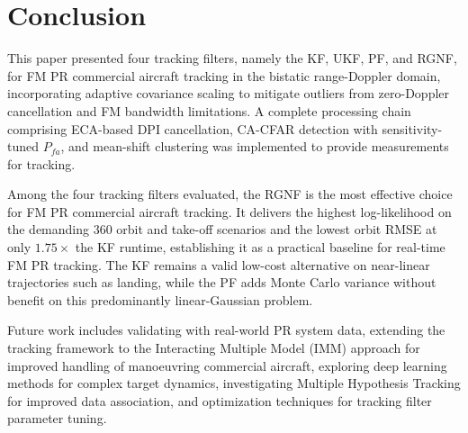 \documentclass[conference]{IEEEtran}
\begin{document}
\section{Conclusion}

This paper presented four tracking filters, namely the KF, UKF, PF, and RGNF, for FM PR commercial aircraft tracking in the bistatic range-Doppler domain, incorporating adaptive covariance scaling to mitigate outliers from zero-Doppler cancellation and FM bandwidth limitations. A complete processing chain comprising ECA-based DPI cancellation, CA-CFAR detection with sensitivity-tuned $P_{fa}$, and mean-shift clustering was implemented to provide measurements for tracking.

Among the four tracking filters evaluated, the RGNF is the most effective choice for FM PR commercial aircraft tracking. It delivers the highest log-likelihood on the demanding 360\textdegree{} orbit and take-off scenarios and the lowest orbit RMSE at only $1.75{\times}$ the KF runtime, establishing it as a practical baseline for real-time FM PR tracking. The KF remains a valid low-cost alternative on near-linear trajectories such as landing, while the PF adds Monte Carlo variance without benefit on this predominantly linear-Gaussian problem.

Future work includes validating with real-world PR system data, extending the tracking framework to the Interacting Multiple Model (IMM) approach for improved handling of manoeuvring commercial aircraft, exploring deep learning methods for complex target dynamics, investigating Multiple Hypothesis Tracking for improved data association, and optimization techniques for tracking filter parameter tuning.



\end{document}

